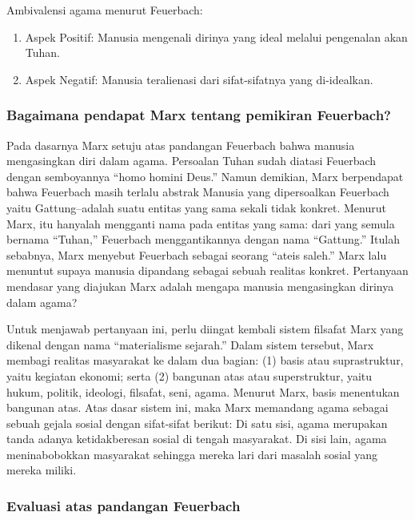 \documentclass[11pt,twoside,a5paper,openany]{memoir}
\def\tightlist{}
\begin{document}
Ambivalensi agama menurut Feuerbach:

\begin{enumerate}
\def\labelenumi{\arabic{enumi}.}
\tightlist
\item
  Aspek Positif: Manusia mengenali dirinya yang ideal melalui pengenalan
  akan Tuhan.
\item
  Aspek Negatif: Manusia teralienasi dari sifat-sifatnya yang
  di-idealkan.
\end{enumerate}

\hypertarget{bagaimana-pendapat-marx-tentang-pemikiran-feuerbach}{%
\subsubsection{Bagaimana pendapat Marx tentang pemikiran
Feuerbach?}\label{bagaimana-pendapat-marx-tentang-pemikiran-feuerbach}}

Pada dasarnya Marx setuju atas pandangan Feuerbach bahwa manusia
mengasingkan diri dalam agama. Persoalan Tuhan sudah diatasi Feuerbach
dengan semboyannya ``homo homini Deus.'' Namun demikian, Marx
berpendapat bahwa Feuerbach masih terlalu abstrak Manusia yang
dipersoalkan Feuerbach yaitu Gattung--adalah suatu entitas yang sama
sekali tidak konkret. Menurut Marx, itu hanyalah mengganti nama pada
entitas yang sama: dari yang semula bernama ``Tuhan,'' Feuerbach
menggantikannya dengan nama ``Gattung.'' Itulah sebabnya, Marx menyebut
Feuerbach sebagai seorang ``ateis saleh.'' Marx lalu menuntut supaya
manusia dipandang sebagai sebuah realitas konkret. Pertanyaan mendasar
yang diajukan Marx adalah mengapa manusia mengasingkan dirinya dalam
agama?

Untuk menjawab pertanyaan ini, perlu diingat kembali sistem filsafat
Marx yang dikenal dengan nama ``materialisme sejarah.'' Dalam sistem
tersebut, Marx membagi realitas masyarakat ke dalam dua bagian: (1)
basis atau suprastruktur, yaitu kegiatan ekonomi; serta (2) bangunan
atas atau superstruktur, yaitu hukum, politik, ideologi, filsafat, seni,
agama. Menurut Marx, basis menentukan bangunan atas. Atas dasar sistem
ini, maka Marx memandang agama sebagai sebuah gejala sosial dengan
sifat-sifat berikut: Di satu sisi, agama merupakan tanda adanya
ketidakberesan sosial di tengah masyarakat. Di sisi lain, agama
meninabobokkan masyarakat sehingga mereka lari dari masalah sosial yang
mereka miliki.

\hypertarget{evaluasi-atas-pandangan-feuerbach}{%
\subsubsection{Evaluasi atas pandangan
Feuerbach}\label{evaluasi-atas-pandangan-feuerbach}}
\end{document}
